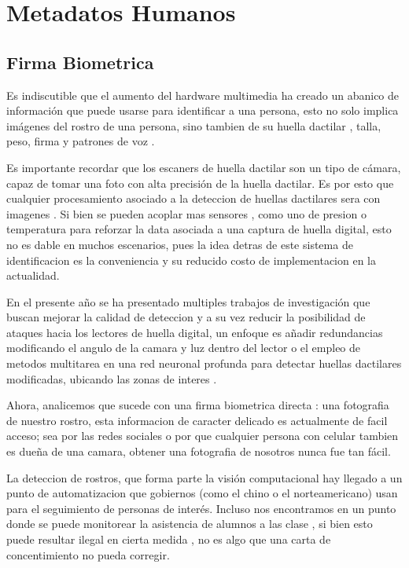 \documentclass[a4paper]{IEEEtranUNT}
\begin{document}
\section{Metadatos Humanos}

\subsection{Firma Biometrica}

Es indiscutible que el aumento del hardware multimedia ha creado un abanico de información que puede usarse para identificar a una persona, esto no solo implica imágenes del rostro de una persona, sino tambien de su huella dactilar , talla, peso, firma y patrones de voz \citep{10.1145/3287560.3287568}.

Es importante recordar que los escaners de huella dactilar son un tipo de cámara, capaz de tomar una foto con alta precisión de la huella dactilar. Es por esto que cualquier procesamiento asociado a la deteccion de huellas dactilares sera con imagenes \citep{spinoulas2020multimodal}. Si bien se pueden acoplar mas sensores , como uno de presion o temperatura para reforzar la data asociada a una captura de huella digital, esto no es dable en muchos escenarios, pues la idea detras de este sistema de identificacion es la conveniencia y su reducido costo de implementacion en la actualidad.

En el presente año se ha presentado multiples trabajos de investigación que buscan mejorar la calidad de deteccion y a su vez reducir la posibilidad de ataques hacia los lectores de huella digital, un enfoque es añadir redundancias modificando el angulo de la camara y luz dentro del lector \citep{spinoulas2020multimodal} o el empleo de metodos multitarea en una red neuronal profunda para detectar huellas dactilares modificadas, ubicando las zonas de interes \citep{giudice2020single}.

Ahora, analicemos que sucede con una firma biometrica directa : una fotografia de nuestro rostro, esta informacion de caracter delicado es actualmente de facil acceso; sea por las redes sociales o por que cualquier persona con celular tambien es dueña de una camara, obtener una fotografia de nosotros nunca fue tan fácil.

La deteccion de rostros, que forma parte la visión computacional \citep{Pezoa2017} hay llegado a un punto de automatizacion que gobiernos (como el chino o el norteamericano) usan para el seguimiento de personas de interés. Incluso nos encontramos en un punto donde se puede monitorear la asistencia de alumnos a las clase \citep{Harikrishnan2019}, si bien esto puede resultar ilegal en cierta medida \citep{Cote2017} , no es algo que una carta de concentimiento no pueda corregir.
\end{document}
